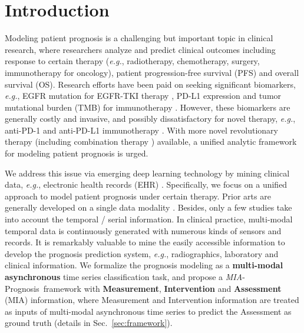 \documentclass[runningheads]{llncs}
\newcommand{\eg}{\textit{e.g.}}
\newcommand{\miap}{\emph{MIA}-Prognosis}
\begin{document}
\section{Introduction}

Modeling patient prognosis is a challenging but important topic in clinical research, where researchers analyze and predict clinical outcomes including response to certain therapy (\eg, radiotherapy, chemotherapy, surgery, immunotherapy for oncology), patient progression-free survival (PFS) and overall survival (OS). Research efforts have been paid on seeking significant biomarkers, \eg, EGFR mutation for EGFR-TKI therapy \cite{Yu2013AnalysisOT}, 
PD-L1 expression and tumor mutational burden (TMB) for immunotherapy \cite{Gibney2016PredictiveBF}. However, these biomarkers are generally costly and invasive, and possibly dissatisfactory for novel therapy, \eg, anti-PD-1 and anti-PD-L1 immunotherapy \cite{Sacher2016BiomarkersFT}. With more novel revolutionary therapy (including combination therapy \cite{Jain2001NormalizingTV}) available, a unified analytic framework for modeling patient prognosis is urged.

We address this issue via emerging deep learning technology by mining clinical data, \eg, electronic health records (EHR) \cite{Rajkomar2018ScalableAA}. Specifically, we focus on a unified approach to model patient prognosis under certain therapy. Prior arts are generally developed on a single data modality \cite{Hosny2018DeepLF,Sun2018ARA}. Besides, only a few studies \cite{Xu2019DeepLP} take into account the temporal / serial information. In clinical practice, multi-modal temporal data is continuously generated with numerous kinds of sensors and records. It is remarkably valuable to mine the easily accessible information to develop the prognosis prediction system, \eg, radiographics, laboratory and clinical information. We formalize the prognosis modeling as a \textbf{multi-modal asynchronous} time series classification task, and propose a \miap~framework with \textbf{Measurement}, \textbf{Intervention} and \textbf{Assessment} (MIA) information, where Measurement and Intervention information are treated as inputs of multi-modal asynchronous time series to predict the Assessment as ground truth (details in Sec.~\ref{sec:framework}). 
\end{document}
